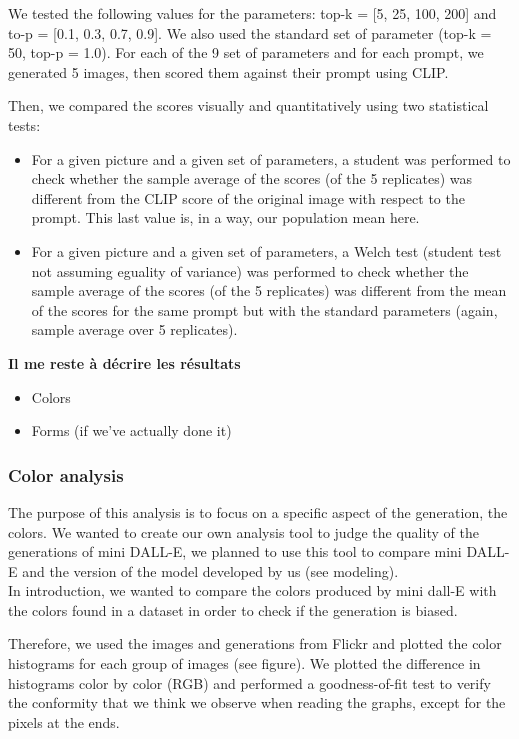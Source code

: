 \documentclass{article}
\begin{document}
We tested the following values for the parameters: top-k = [5, 25, 100, 200] and to-p = [0.1, 0.3, 0.7, 0.9]. We also used the standard set of parameter (top-k = 50, top-p = 1.0). For each of the 9 set of parameters and for each prompt, we generated 5 images, then scored them against their prompt using CLIP.

Then, we compared the scores visually and quantitatively using two statistical tests:
\begin{itemize}
    \item For a given picture and a given set of parameters, a student was performed to check whether the sample average of the scores (of the 5 replicates) was different from the CLIP score of the original image with respect to the prompt. This last value is, in a way, our population mean here. 
    \item For a given picture and a given set of parameters, a Welch test (student test not assuming eguality of variance) was performed to check whether the sample average of the scores (of the 5 replicates) was different from the mean of the scores for the same prompt but with the standard parameters (again, sample average over 5 replicates). 
\end{itemize}

\textbf{Il me reste à décrire les résultats}


\begin{itemize}
    \item Colors
    \item Forms (if we've actually done it)
\end{itemize}

\subsubsection{Color analysis}

The purpose of this analysis is to focus on a specific aspect of the generation, the colors. 
We wanted to create our own analysis tool to judge the quality of the generations of mini DALL-E, we planned to use this tool to compare mini DALL-E and the version of the model developed by us (see modeling).\\

In introduction, we wanted to compare the colors produced by mini dall-E with the colors found in a dataset in order to check if the generation is biased. 

Therefore, we used the images and generations from Flickr and plotted the color histograms for each group of images (see figure). We plotted the difference in histograms color by color (RGB) and performed a goodness-of-fit test to verify the conformity that we think we observe when reading the graphs, except for the pixels at the ends.
\end{document}
